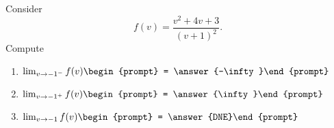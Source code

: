 \documentclass{ximera}
\author{Bart Snapp}
\begin{document}
\begin{exercise}
Consider 
\[
f(v) = \frac{v^2+4 v+3}{(v+1)^2}.
\]
Compute
\begin{enumerate}
\item $\lim_{v\to -1^- } f(v) \begin{prompt} = \answer{-\infty}\end{prompt}$
\item $\lim_{v\to -1^+ } f(v) \begin{prompt} = \answer{\infty}\end{prompt}$
\item $\lim_{v\to -1 } f(v) \begin{prompt} = \answer{DNE}\end{prompt}$
\end{enumerate}
\end{exercise}
\end{document}
